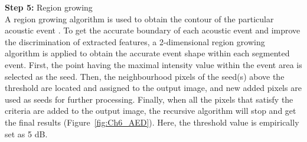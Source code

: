 \noindent \textbf{Step 5:} Region growing
\\
A region growing algorithm is used to obtain the contour of the particular acoustic event \citep{mallawaarachchi2008spectrogram}. To get the accurate boundary of each acoustic event and improve the discrimination of extracted features, a 2-dimensional region growing algorithm is applied to obtain the accurate event shape within each segmented event. First, the point having the maximal intensity value within the event area is selected as the seed. Then, the neighbourhood pixels of the seed(s) above the threshold are located and assigned to the output image, and new added pixels are used as seeds for further processing. Finally, when all the pixels that satisfy the criteria are added to the output image, the recursive algorithm will stop and get the final results (Figure~\ref{fig:Ch6_AED}). Here, the threshold value is empirically set as 5 dB.

